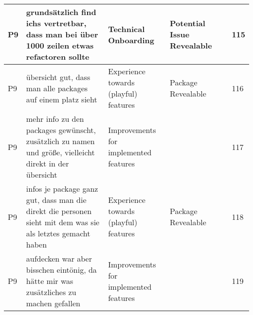 \begin{appendices}
\begin{landscape}
\begin{longtable}{|p{0.8cm}|p{7cm}|p{3cm}|p{3cm}|p{5.5cm}|p{0.5cm}|}
      P9                   & grundsätzlich find ichs vertretbar, dass man bei über 1000 zeilen etwas refactoren sollte                                                                                                                                                                                   & Technical Onboarding                     & Potential Issue Revealable         &                                                                                                                                                    & 115          \\ \hline
      P9                   & übersicht gut, dass man alle packages auf einem platz sieht                                                                                                                                                                                                                 & Experience towards (playful) features    & Package Revealable                 &                                                                                                                                                    & 116          \\ \hline
      P9                   & mehr info zu den packages gewünscht, zusätzlich zu namen und größe, vielleicht direkt in der übersicht                                                                                                                                                                      & Improvements for implemented features    &                                    &                                                                                                                                                    & 117          \\ \hline
      P9                   & infos je package ganz gut, dass man die direkt die personen sieht mit dem was sie als letztes gemacht haben                                                                                                                                                                 & Experience towards (playful) features    & Package Revealable                 &                                                                                                                                                    & 118          \\ \hline
      P9                   & aufdecken war aber bisschen eintönig, da hätte mir was zusätzliches zu machen gefallen                                                                                                                                                                                      & Improvements for implemented features    &                                    &                                                                                                                                                    & 119          \\ \hline

\end{longtable}
\end{landscape}
\end{appendices}
